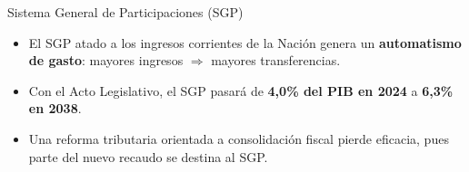 \begin{frame}{Sistema General de Participaciones (SGP)}
\begin{itemize}
  \item El SGP atado a los ingresos corrientes de la Nación genera un \textbf{automatismo de gasto}: mayores ingresos $\Rightarrow$ mayores transferencias.
  \item Con el Acto Legislativo, el SGP pasará de \textbf{4,0\% del PIB en 2024} a \textbf{6,3\% en 2038}.
  \item Una reforma tributaria orientada a consolidación fiscal pierde eficacia, pues parte del nuevo recaudo se destina al SGP.
\end{itemize}
\end{frame}


